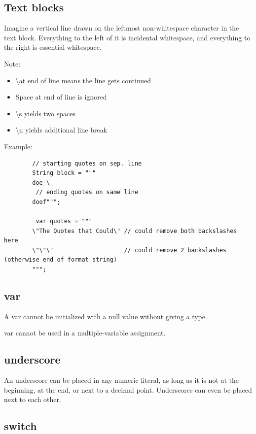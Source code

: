 \documentclass{scrartcl}
\begin{document}
\subsection{Text blocks}

    Imagine a vertical line drawn on the leftmost non-­whitespace character in the text block. Everything to the left of it is incidental whitespace, and everything to the right is essential whitespace.

    Note:
    \begin{itemize}
        \item  \textbackslash at end of line means the line gets continued
        \item Space at end of line is ignored
        \item \textbackslash s yields two spaces
        \item  \textbackslash n yields additional line break
    \end{itemize}

    Example:

    \begin{lstlisting}
        // starting quotes on sep. line
        String block = """
        doe \
         // ending quotes on same line
        doof""";

         var quotes = """
        \"The Quotes that Could\" // could remove both backslashes here
        \"\"\"                    // could remove 2 backslashes (otherwise end of format string)
        """;
    \end{lstlisting}

\subsection{var}

    A var cannot be initialized with a null value without giving a type.

    var cannot be used in a multiple-­variable assignment.

\subsection{underscore}

    An underscore can be placed in any numeric literal, as long as it is not at the beginning, at the end, or next to a decimal point. Underscores can even be placed next to each other.

\subsection{switch}
\end{document}
